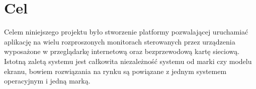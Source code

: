 \section{Cel}
\label{sec:goal}
Celem niniejszego projektu było stworzenie platformy pozwalającej uruchamiać aplikację na wielu rozproszonych monitorach sterowanych przez urządzenia wyposażone w przeglądarkę internetową oraz bezprzewodową kartę sieciową.  
Istotną zaletą systemu jest całkowita niezależność systemu od marki czy modelu ekranu, bowiem rozwiązania na rynku są powiązane z jednym systemem operacyjnym i jedną marką.
